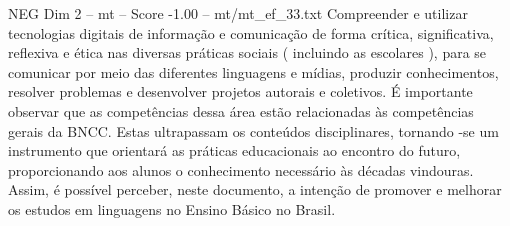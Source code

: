 \begin{textsample}{NEG Dim 2 – mt – Score -1.00 – mt/mt\_ef\_33.txt}
Compreender e utilizar tecnologias digitais de informação e comunicação de forma crítica, significativa, reflexiva e ética nas diversas práticas sociais ( incluindo as escolares ), para se comunicar por meio das diferentes linguagens e mídias, produzir conhecimentos, resolver problemas e desenvolver projetos autorais e coletivos.
É importante observar que as competências dessa área estão relacionadas às competências gerais da BNCC.
Estas ultrapassam os conteúdos disciplinares, tornando -se um instrumento que orientará as práticas educacionais ao encontro do futuro, proporcionando aos alunos o conhecimento necessário às décadas vindouras.
Assim, é possível perceber, neste documento, a intenção de promover e melhorar os estudos em linguagens no Ensino Básico no Brasil.

\end{textsample}
